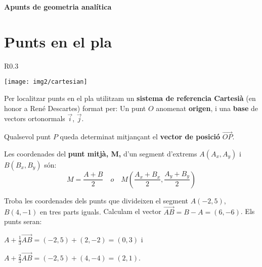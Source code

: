 \documentclass[11pt, a4paper, pdf]{article}
\begin{document}
\pagestyle{blocfancy}
\setcounter{myenumi}{0}
 
 \begin{center}
 {\Large  \textbf{Apunts de geometria analítica}}
 \end{center}
 
\vspace{-0.5cm}
\section{Punts en el pla}

\begin{bluebox}
	\begin{wrapfigure}{R}{0.3\textwidth} 
		\vspace{-0.5cm}
		\begin{center}
			\texttt{[image: img2/cartesian]}
		\end{center}
	\end{wrapfigure}
	Per localitzar punts en el pla utilitzam un \textbf{sistema de referencia Cartesià} (en honor a René Descartes) format per:
 	 Un punt $O$ anomenat \textbf{origen}, i 
	  una \textbf{base} de vectors ortonormals $\vec i$, $\vec j$.
	 
	Qualsevol punt $P$ queda determinat mitjançant el \textbf{vector de posició} $\overrightarrow{OP}$.
\end{bluebox}
 \vspace{-0.5cm}
\begin{theorybox}
	Les coordenades del \textbf{punt mitjà, M,} d'un segment d'extrems $A(A_x, A_y)$ i $B(B_x, B_y)$ són:
	\begin{equation}
	M=\frac{A+B}{2} \,\,\,\,\,\, o \,\,\,\,\,\, M \left( \frac{A_x+B_x}{2},  \frac{A_y+B_y}{2} \right)
	\end{equation}
	
\end{theorybox}
\vspace{-0.5cm}

\begin{resolt}{Troba les coordenades dels punts que divideixen el segment $A(-2,5)$, $B(4,-1)$ en tres parts iguals.}
	Calculam el vector $\overrightarrow{AB}=B-A=(6,-6)$. Els punts seran:
	
	$A+\frac{1}{3}\overrightarrow{AB}=(-2,5)+(2,-2)=(0,3)$ i
	
	$A+\frac{2}{3}\overrightarrow{AB}=(-2,5)+(4,-4)=(2,1)$.
\end{resolt}
\end{document}
